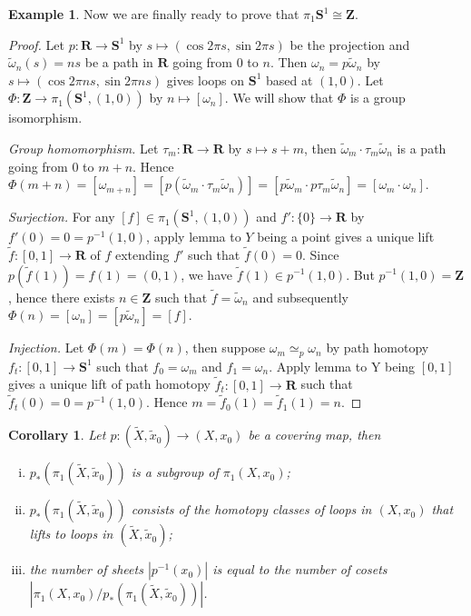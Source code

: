 \documentclass[11pt]{article}
\theoremstyle{definition}
\newtheorem*{example}{Example}
\theoremstyle{plain}
\newtheorem*{corollary}{Corollary}
\theoremstyle{remark}
\newcommand{\R}{\mathbf{R}}
\newcommand{\Z}{\mathbf{Z}}
\begin{document}
\begin{example}
Now we are finally ready to prove that $\pi_1\mathbf{S}^1\cong\Z$.
\begin{proof}
Let $p:\R\to\mathbf{S}^1$ by $s\mapsto(\cos2\pi s,\sin2\pi s)$ be the projection and $\widetilde{\omega}_n(s)=ns$ be a path in $\R$ going from $0$ to $n$. Then $\omega_n=p\widetilde{\omega}_n$ by $s\mapsto(\cos2\pi ns,\sin2\pi ns)$ gives loops on $\mathbf{S}^1$ based at $(1,0)$. Let $\Phi:\Z\to\pi_1(\mathbf{S}^1,(1,0))$ by $n\mapsto[\omega_n]$. We will show that $\Phi$ is a group isomorphism.\medbreak

\textit{Group homomorphism.} Let $\tau_m:\R\to\R$ by $s\mapsto s+m$, then $\widetilde{\omega}_m\cdot\tau_m\widetilde{\omega}_n$ is a path going from $0$ to $m+n$. Hence $\Phi(m+n)=[\omega_{m+n}]=[p(\widetilde{\omega}_m\cdot\tau_m\widetilde{\omega}_n)]=[p\widetilde{\omega}_m\cdot p\tau_m\widetilde{\omega}_n]=[\omega_m\cdot\omega_n]$.\medbreak

\textit{Surjection.} For any $[f]\in\pi_1(\mathbf{S}^1,(1,0))$ and $f':\{0\}\to\R$ by $f'(0)=0=p^{-1}(1,0)$, apply lemma to $Y$ being a point gives a unique lift $\widetilde{f}:[0,1]\to\R$ of $f$ extending $f'$ such that $\widetilde{f}(0)=0$. Since $p(\widetilde{f}(1))=f(1)=(0,1)$, we have $\widetilde{f}(1)\in p^{-1}(1,0)$. But $p^{-1}(1,0)=\Z$, hence there exists $n\in\Z$ such that $\widetilde{f}=\widetilde{\omega}_n$ and subsequently $\Phi(n)=[\omega_n]=[p\widetilde{\omega}_n]=[f]$.\medbreak

\textit{Injection. }Let $\Phi(m)=\Phi(n)$, then suppose $\omega_m\simeq_p\omega_n$ by path homotopy $f_t:[0,1]\to\mathbf{S}^1$ such that $f_0=\omega_m$ and $f_1=\omega_n$. Apply lemma to Y being $[0,1]$ gives a unique lift of path homotopy $\widetilde{f}_t:[0,1]\to\R$ such that $\widetilde{f}_t(0)=0=p^{-1}(1,0)$. Hence $m=\widetilde{f}_0(1)=\widetilde{f}_1(1)=n$.
\end{proof}
\end{example}

\begin{corollary}
Let $p:(\widetilde{X},\widetilde{x}_0)\to(X,x_0)$ be a covering map, then\begin{enumerate}[(i)]
    \item $p_\ast(\pi_1(\widetilde{X},\widetilde{x}_0))$ is a subgroup of $\pi_1(X,x_0)$;
    \item $p_\ast(\pi_1(\widetilde{X},\widetilde{x}_0))$ consists of the homotopy classes of loops in $(X,x_0)$ that lifts to loops in $(\widetilde{X},\widetilde{x}_0)$;
    \item the number of sheets $|p^{-1}(x_0)|$ is equal to the number of cosets $|\pi_1(X,x_0)/p_\ast(\pi_1(\widetilde{X},\widetilde{x}_0))|$.
\end{enumerate}
\end{corollary}
\end{document}
